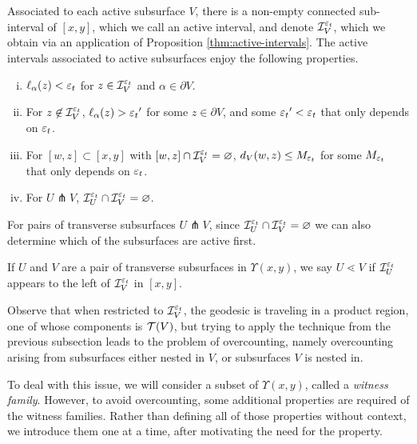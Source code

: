 \documentclass[12pt, reqno]{amsart}
\begin{document}
Associated to each active subsurface $V$, there is a non-empty connected sub-interval of $[x,y]$, which we call an active interval, and denote $\mathcal{I}_V^{\varepsilon_t}$, which we obtain via an application of Proposition \ref{thm:active-intervals}.
The active intervals associated to active subsurfaces enjoy the following properties.
\begin{enumerate}[(i)]
\item $\ell_\alpha(z) < \varepsilon_t$ for $z \in \mathcal{I}_V^{\varepsilon_t}$ and $\alpha \in \partial V$.
\item For $z \not \in \mathcal{I}_V^{\varepsilon_t}$, $\ell_{\alpha}(z) > {\varepsilon_t}^{\prime}$ for some $z \in \partial V$, and some ${\varepsilon_t}^{\prime} < {\varepsilon_t}$ that only depends on ${\varepsilon_t}$.
\item For $[w,z] \subset [x,y]$ with $[w,z] \cap \mathcal{I}_V^{\varepsilon_t} = \varnothing$, $d_V(w,z) \leq M_{\varepsilon_t}$ for some $M_{\varepsilon_t}$ that only depends on ${\varepsilon_t}$.
\item For $U \pitchfork V$, $\mathcal{I}_U^{\varepsilon_t} \cap \mathcal{I}_V^{\varepsilon_t} = \varnothing$.
\end{enumerate}

For pairs of transverse subsurfaces $U \pitchfork V$, since $\mathcal{I}_U^{\varepsilon_t} \cap \mathcal{I}_V^{\varepsilon_t} = \varnothing$ we can also determine which of the subsurfaces are active first.
\begin{definition}
  If $U$ and $V$ are a pair of transverse subsurfaces in $\Upsilon(x,y)$, we say $U \lessdot V$ if $\mathcal{I}_U^{\varepsilon_t}$ appears to the left of $\mathcal{I}_V^{\varepsilon_t}$ in $[x,y]$.
\end{definition}

Observe that when restricted to $\mathcal{I}_V^{\varepsilon_t}$, the geodesic is traveling in a product region, one of whose components is $\mathcal{T}(V)$, but trying to apply the technique from the previous subsection leads to the problem of overcounting, namely overcounting arising from subsurfaces either nested in $V$, or subsurfaces $V$ is nested in.

To deal with this issue, we will consider a subset of $\Upsilon(x,y)$, called a \emph{witness family}.
However, to avoid overcounting, some additional properties are required of the witness families.
Rather than defining all of those properties without context, we introduce them one at a time, after motivating the need for the property.
\end{document}
